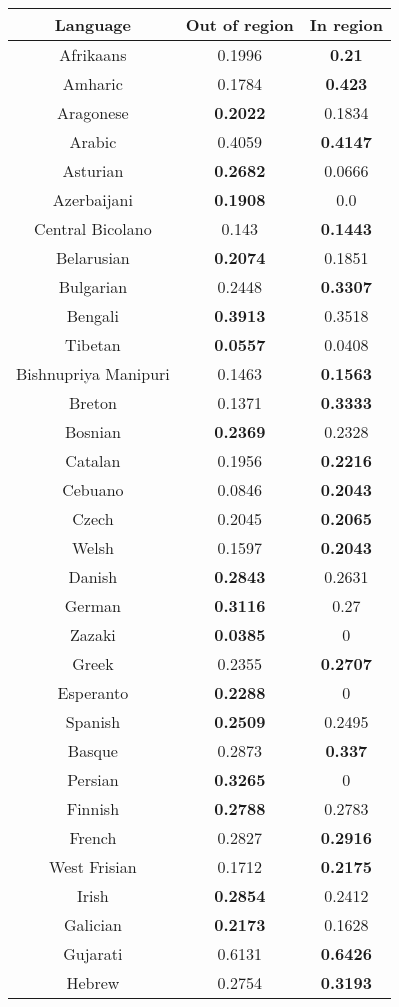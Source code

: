 \begin{figure}[h]
\begin{tabular}{ccc}\hline\hline
Language&Out of region&In region\\
\hline
Afrikaans&0.1996&\textbf{0.21}\\
Amharic&0.1784&\textbf{0.423}\\
Aragonese&\textbf{0.2022}&0.1834\\
Arabic&0.4059&\textbf{0.4147}\\
Asturian&\textbf{0.2682}&0.0666\\
Azerbaijani&\textbf{0.1908}&0.0\\
Central Bicolano&0.143&\textbf{0.1443}\\
Belarusian&\textbf{0.2074}&0.1851\\
Bulgarian&0.2448&\textbf{0.3307}\\
Bengali&\textbf{0.3913}&0.3518\\
Tibetan&\textbf{0.0557}&0.0408\\
Bishnupriya Manipuri&0.1463&\textbf{0.1563}\\
Breton&0.1371&\textbf{0.3333}\\
Bosnian&\textbf{0.2369}&0.2328\\
Catalan&0.1956&\textbf{0.2216}\\
Cebuano&0.0846&\textbf{0.2043}\\
Czech&0.2045&\textbf{0.2065}\\
Welsh&0.1597&\textbf{0.2043}\\
Danish&\textbf{0.2843}&0.2631\\
German&\textbf{0.3116}&0.27\\
Zazaki&\textbf{0.0385}&0\\
Greek&0.2355&\textbf{0.2707}\\
Esperanto&\textbf{0.2288}&0\\
Spanish&\textbf{0.2509}&0.2495\\
Basque&0.2873&\textbf{0.337}\\
Persian&\textbf{0.3265}&0\\
Finnish&\textbf{0.2788}&0.2783\\
French&0.2827&\textbf{0.2916}\\
West Frisian&0.1712&\textbf{0.2175}\\
Irish&\textbf{0.2854}&0.2412\\
Galician&\textbf{0.2173}&0.1628\\
Gujarati&0.6131&\textbf{0.6426}\\
Hebrew&0.2754&\textbf{0.3193}\\

\end{tabular}
\end{figure}

